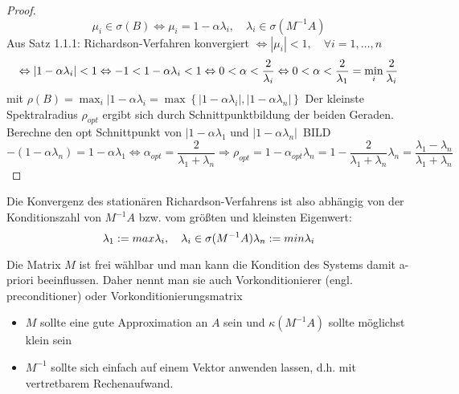  \begin{proof}
   \begin{equation*}
     \mu_i \in \sigma(B) \Leftrightarrow \mu_i = 1-\alpha \lambda_i, \quad \lambda_i\in \sigma(M^{-1}A)
   \end{equation*}
   Aus Satz 1.1.1: Richardson-Verfahren konvergiert $\Leftrightarrow |\mu_i| <1, \quad \forall i = 1, \dots, n$
   \begin{equation*}
     \Leftrightarrow |1-\alpha\lambda_i| < 1\\
     \Leftrightarrow -1 < 1 - \alpha \lambda_i < 1 
     \Leftrightarrow 0 < \alpha < \frac{2}{\lambda_i} 
     \Leftrightarrow 0 < \alpha < \frac{2}{\lambda_1} = \min_i \frac{2}{\lambda_i}
   \end{equation*}
   mit $\rho(B) = \max_i |1-\alpha\lambda_i = \max \left\{ |1-\alpha\lambda_i|, |1-\alpha\lambda_n| \right\}$
   Der kleinste Spektralradius $\rho_{opt}$ ergibt sich durch Schnittpunktbildung der beiden Geraden. Berechne den opt Schnittpunkt von $|1-\alpha\lambda_1$ und $|1-\alpha\lambda_n|$\
BILD
   \begin{equation*}
     -(1-\alpha\lambda_n) = 1-\alpha\lambda_1 
     \Leftrightarrow \alpha_{opt} = \frac{2}{\lambda_1+\lambda_n}
     \Rightarrow \rho_{opt} = 1-\alpha_{opt} \lambda_n = 1 - \frac{2}{\lambda_1+\lambda_n} \lambda_n = \frac{\lambda_1-\lambda_n}{\lambda_1+\lambda_n}
   \end{equation*}
 \end{proof}

 Die Konvergenz des stationären Richardson-Verfahrens ist also abhängig von der Konditionszahl von $M^{-1}A$ bzw. vom größten und kleinsten Eigenwert:
 \begin{equation*}
   \lambda_1 := max \lambda_i, \quad \lambda_i \in \sigma(M^{-1}A)\\
   \lambda_n := min \lambda_i
 \end{equation*}

 \begin{bemerkung}
 Die Matrix $M$ ist frei wählbar und man kann die Kondition des Systems damit a-priori beeinflussen. Daher nennt man sie auch Vorkonditionierer (engl. preconditioner) oder Vorkonditionierungsmatrix
 \begin{itemize}
   \item $M$ sollte eine gute Approximation an $A$ sein und $\kappa(M^{-1}A)$ sollte möglichst klein sein
   \item $M^{-1}$ sollte sich einfach auf einem Vektor anwenden lassen, d.h. mit vertretbarem Rechenaufwand. 
 \end{itemize}
 \end{bemerkung}

